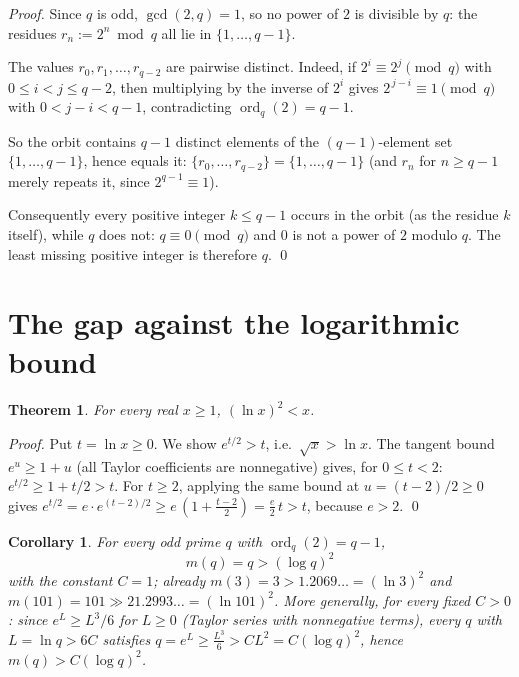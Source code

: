 \documentclass[11pt]{article}
\newtheorem{theorem}{Theorem}
\newtheorem{corollary}{Corollary}
\theoremstyle{definition}
\begin{document}
\begin{proof}
Since $q$ is odd, $\gcd(2,q)=1$, so no power of $2$ is divisible by $q$: the
residues $r_n := 2^n \bmod q$ all lie in $\{1,\dots,q-1\}$.

The values $r_0, r_1, \dots, r_{q-2}$ are pairwise distinct.  Indeed, if
$2^i \equiv 2^j \pmod q$ with $0 \le i < j \le q-2$, then multiplying by the
inverse of $2^i$ gives $2^{\,j-i} \equiv 1 \pmod q$ with $0 < j-i < q-1$,
contradicting $\operatorname{ord}_q(2) = q-1$.

So the orbit contains $q-1$ distinct elements of the $(q-1)$-element set
$\{1,\dots,q-1\}$, hence equals it: $\{r_0,\dots,r_{q-2}\} = \{1,\dots,q-1\}$
(and $r_n$ for $n \ge q-1$ merely repeats it, since $2^{q-1}\equiv 1$).

Consequently every positive integer $k \le q-1$ occurs in the orbit (as the
residue $k$ itself), while $q$ does not: $q \equiv 0 \pmod q$ and $0$ is not a
power of $2$ modulo $q$.  The least missing positive integer is therefore
$q$.  \qed
\end{proof}

\section{The gap against the logarithmic bound}

\begin{theorem}\label{thm:gap}
For every real $x \ge 1$, $(\ln x)^2 < x$.
\end{theorem}

\begin{proof}
Put $t=\ln x \ge 0$.  We show $e^{t/2} > t$, i.e.\ $\sqrt{x} > \ln x$.
The tangent bound $e^u \ge 1+u$ (all Taylor coefficients are nonnegative) gives,
for $0 \le t < 2$: $e^{t/2} \ge 1 + t/2 > t$.  For $t \ge 2$, applying the same
bound at $u=(t-2)/2 \ge 0$ gives
$e^{t/2} = e \cdot e^{(t-2)/2} \ge e\,(1+\tfrac{t-2}{2}) = \tfrac{e}{2}\,t > t$,
because $e > 2$.  \qed
\end{proof}

\begin{corollary}\label{cor:refute}
For every odd prime $q$ with $\operatorname{ord}_q(2)=q-1$,
\[
m(q) = q > (\log q)^2
\]
with the constant $C=1$; already $m(3)=3 > 1.2069\ldots=(\ln 3)^2$ and
$m(101)=101 \gg 21.2993\ldots=(\ln 101)^2$.  More generally, for every fixed
$C>0$: since $e^{L} \ge L^3/6$ for $L\ge0$ (Taylor series with nonnegative
terms), every $q$ with $L=\ln q > 6C$ satisfies
$q = e^{L} \ge \tfrac{L^3}{6} > C L^2 = C(\log q)^2$, hence
$m(q) > C(\log q)^2$.
\end{corollary}
\end{document}
